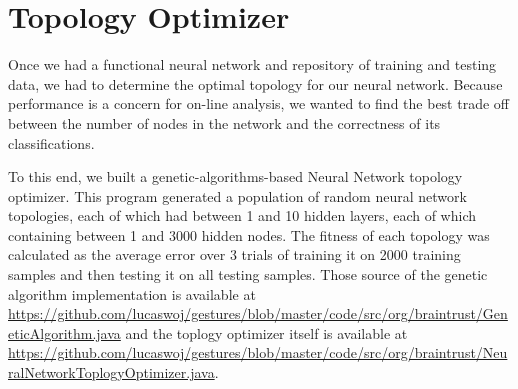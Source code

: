 \documentclass{report}
\begin{document}
\section{Topology Optimizer}


Once we had a functional neural network and repository of training and testing data, we had to determine the optimal topology for our neural network. Because performance is a concern for on-line analysis, we wanted to find the best trade off between the number of nodes in the network and the correctness of its classifications.

To this end, we built a genetic-algorithms-based Neural Network topology optimizer. This program generated a population of random neural network topologies, each of which had between 1 and 10 hidden layers, each of which containing between 1 and 3000 hidden nodes. The fitness of each topology was calculated as the average error over 3 trials of training it on 2000 training samples and then testing it on all testing samples. Those source of the genetic algorithm implementation is available at \url{https://github.com/lucaswoj/gestures/blob/master/code/src/org/braintrust/GeneticAlgorithm.java} and the toplogy optimizer itself is available at \url{https://github.com/lucaswoj/gestures/blob/master/code/src/org/braintrust/NeuralNetworkToplogyOptimizer.java}.
\end{document}
